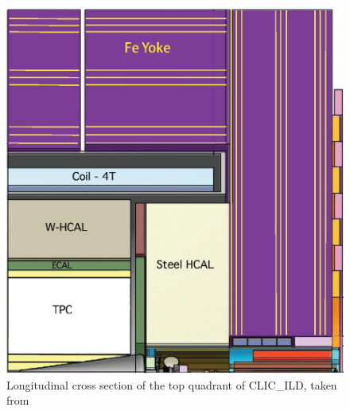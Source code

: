 \documentclass[a4paper,11pt]{article}
\begin{document}
\begin{figure}[htbp]
\centering %

\includegraphics[width=.45\textwidth]{plots/CLICILD.eps}
\qquad
\caption{\label{fig:ILD} Longitudinal cross section of the top quadrant of CLIC\_ILD, taken from \cite{Linssen:2012hp}
}
\end{figure}








\end{document}
